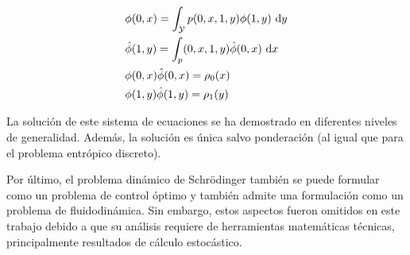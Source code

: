 \begin{align*}
	&\phi(0,x) = \int_{\mathcal{Y}} p(0,x,1,y)\phi(1,y) \,\operatorname{d}\! y\\
	&\hat\phi(1,y) = \int_ p(0,x,1,y)\hat\phi(0,x) \,\operatorname{d}\! x\\
	& \phi(0,x)\hat\phi(0,x) = \rho_0(x)\\
	& \phi(1,y)\hat\phi(1,y) = \rho_1(y)
\end{align*}

La solución de este sistema de ecuaciones se ha demostrado en diferentes niveles de generalidad. Además, la solución es única salvo ponderación (al igual que para el problema entrópico discreto).

Por último, el problema dinámico de Schrödinger también se puede formular como un problema de control óptimo y también admite una formulación como un problema de fluidodinámica. Sin embargo, estos aspectos fueron omitidos en este trabajo debido a que su análisis requiere de herramientas matemáticas técnicas, principalmente resultados de cálculo estocástico.